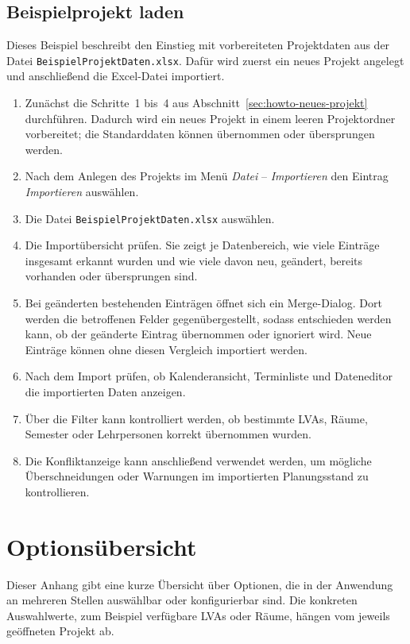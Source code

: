 \documentclass[12pt,a4paper]{article}
\begin{document}
\subsection{Beispielprojekt laden}

Dieses Beispiel beschreibt den Einstieg mit vorbereiteten Projektdaten aus der Datei \texttt{BeispielProjektDaten.xlsx}. Dafür wird zuerst ein neues Projekt angelegt und anschließend die Excel-Datei importiert.

\begin{enumerate}
\item Zunächst die Schritte~1 bis~4 aus Abschnitt~\ref{sec:howto-neues-projekt} durchführen. Dadurch wird ein neues Projekt in einem leeren Projektordner vorbereitet; die Standarddaten können übernommen oder übersprungen werden.
\item Nach dem Anlegen des Projekts im Menü \textit{Datei} -- \textit{Importieren} den Eintrag \textit{Importieren} auswählen.
\item Die Datei \texttt{BeispielProjektDaten.xlsx} auswählen.
\item Die Importübersicht prüfen. Sie zeigt je Datenbereich, wie viele Einträge insgesamt erkannt wurden und wie viele davon neu, geändert, bereits vorhanden oder übersprungen sind.
\item Bei geänderten bestehenden Einträgen öffnet sich ein Merge-Dialog. Dort werden die betroffenen Felder gegenübergestellt, sodass entschieden werden kann, ob der geänderte Eintrag übernommen oder ignoriert wird. Neue Einträge können ohne diesen Vergleich importiert werden.
\item Nach dem Import prüfen, ob Kalenderansicht, Terminliste und Dateneditor die importierten Daten anzeigen.
\item Über die Filter kann kontrolliert werden, ob bestimmte LVAs, Räume, Semester oder Lehrpersonen korrekt übernommen wurden.
\item Die Konfliktanzeige kann anschließend verwendet werden, um mögliche Überschneidungen oder Warnungen im importierten Planungsstand zu kontrollieren.
\end{enumerate}

\clearpage

\section{Optionsübersicht}

Dieser Anhang gibt eine kurze Übersicht über Optionen, die in der Anwendung an mehreren Stellen auswählbar oder konfigurierbar sind. Die konkreten Auswahlwerte, zum Beispiel verfügbare LVAs oder Räume, hängen vom jeweils geöffneten Projekt ab.
\end{document}
